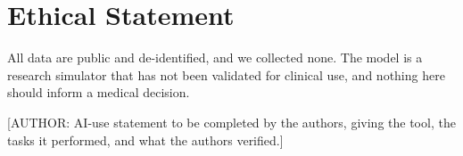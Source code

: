 \documentclass[letterpaper]{article} %
\begin{document}
\section*{Ethical Statement}

All data are public and de-identified, and we collected none. The model is a research simulator that has not been validated for clinical use, and nothing here should inform a medical decision.

[AUTHOR: AI-use statement to be completed by the authors, giving the tool, the tasks it performed, and what the authors verified.]


\end{document}
